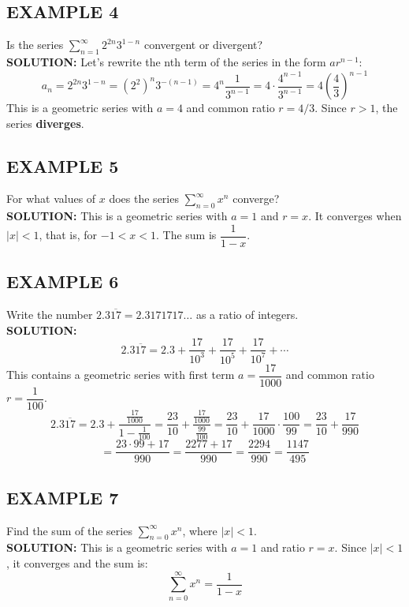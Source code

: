 \documentclass{article}
\begin{document}
\subsection*{EXAMPLE 4}
Is the series \( \sum_{n=1}^{\infty} 2^{2n} 3^{1-n} \) convergent or divergent?\\
\textbf{SOLUTION:}
Let's rewrite the nth term of the series in the form \(ar^{n-1}\):
\[ a_n = 2^{2n} 3^{1-n} = (2^2)^n 3^{-(n-1)} = 4^n \dfrac{1}{3^{n-1}} = 4 \cdot \dfrac{4^{n-1}}{3^{n-1}} = 4 \left( \dfrac{4}{3} \right)^{n-1} \]
This is a geometric series with \(a=4\) and common ratio \(r = 4/3\). Since \(r > 1\), the series \textbf{diverges}.

\subsection*{EXAMPLE 5}
For what values of \(x\) does the series \( \sum_{n=0}^{\infty} x^n \) converge?\\
\textbf{SOLUTION:}
This is a geometric series with \(a=1\) and \(r=x\). It converges when \(|x|<1\), that is, for \(-1 < x < 1\). The sum is \(\dfrac{1}{1-x}\).

\subsection*{EXAMPLE 6}
Write the number \(2.3\overline{17} = 2.3171717\dots\) as a ratio of integers.\\
\textbf{SOLUTION:}
\[ 2.3\overline{17} = 2.3 + \dfrac{17}{10^3} + \dfrac{17}{10^5} + \dfrac{17}{10^7} + \cdots \]
This contains a geometric series with first term \(a = \dfrac{17}{1000}\) and common ratio \(r = \dfrac{1}{100}\).
\[ 2.3\overline{17} = 2.3 + \dfrac{\frac{17}{1000}}{1 - \frac{1}{100}} = \dfrac{23}{10} + \dfrac{\frac{17}{1000}}{\frac{99}{100}} = \dfrac{23}{10} + \dfrac{17}{1000} \cdot \dfrac{100}{99} = \dfrac{23}{10} + \dfrac{17}{990} \]
\[ = \dfrac{23 \cdot 99 + 17}{990} = \dfrac{2277 + 17}{990} = \dfrac{2294}{990} = \dfrac{1147}{495} \]

\subsection*{EXAMPLE 7}
Find the sum of the series \( \sum_{n=0}^{\infty} x^n \), where \(|x|<1\).\\
\textbf{SOLUTION:}
This is a geometric series with \(a=1\) and ratio \(r=x\). Since \(|x|<1\), it converges and the sum is:
\[ \sum_{n=0}^{\infty} x^n = \dfrac{1}{1-x} \]
\end{document}
